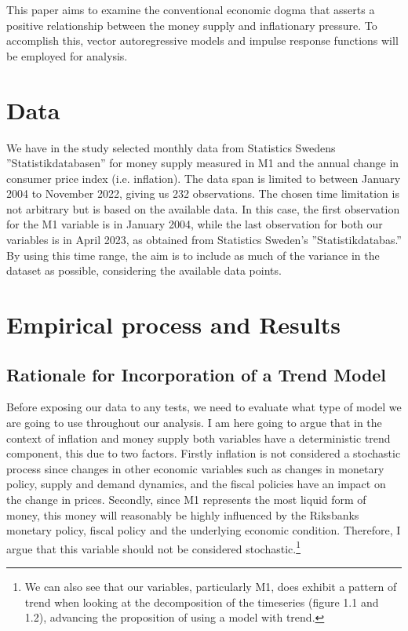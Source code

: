 \documentclass{article}
\begin{document}
    This paper aims to examine the conventional economic dogma that asserts a positive relationship
    between the money supply and inflationary pressure. To accomplish this, vector autoregressive
    models and impulse response functions will be employed for analysis.

    \newpage

    \vspace*{1cm}
    \section*{Data}
    We have in the study selected monthly data from Statistics Swedens ”Statistikdatabasen” for money
    supply measured in M1 and the annual change in consumer price index (i.e. inflation). The data
    span is limited to between January 2004 to November 2022, giving us 232 observations. The chosen
    time limitation is not arbitrary but is based on the available data. In this case, the first
    observation for the M1 variable is in January 2004, while the last observation for both our variables
    is in April 2023, as obtained from Statistics Sweden’s ”Statistikdatabas.” By using this time range,
    the aim is to include as much of the variance in the dataset as possible, considering the available
    data points.

    \section*{Empirical process and Results}
    \subsection*{Rationale for Incorporation of a Trend Model}
    Before exposing our data to any tests, we need to evaluate what type of model we are going 
    to use throughout our analysis. I am here going to argue that in the context of inflation and money 
    supply both variables have a deterministic trend component, this due to two factors. Firstly inflation
    is not considered a stochastic process since changes in other economic variables such as changes
    in monetary policy, supply and demand dynamics, and the fiscal policies have an impact on the change in 
    prices. Secondly, since M1 represents the most liquid form of money, this money will reasonably be 
    highly influenced by the Riksbanks monetary policy, fiscal policy and the underlying economic condition.
    Therefore, I argue that this variable should not be considered stochastic.\footnote{We can also see
    that our variables, particularly M1, does exhibit a pattern of trend when looking at the decomposition
    of the timeseries (figure 1.1 and 1.2), advancing the proposition of using a model with trend.}
    
\end{document}
